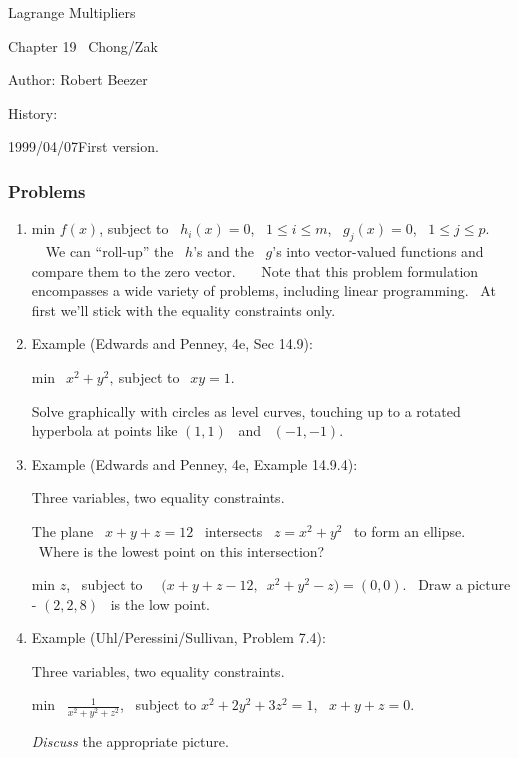\documentclass[12pt,thmsa]{article}
\begin{document}
\vspace{1pt}Lagrange Multipliers

Chapter 19 \ Chong/Zak

Author: Robert Beezer

History:

1999/04/07\qquad First version.

\vspace{1pt}

\subsubsection{Problems}

\vspace{1pt}

\begin{enumerate}
\item  min $f(x)$, subject to \ $h_{i}(x)=0$, \ $1\leq i\leq m$, \ $%
g_{j}(x)=0$, \ $1\leq j\leq p$. \ \ We can ``roll-up'' the \ $h$'s and the \
$g$'s into vector-valued functions and compare them to the zero vector. \ \
\ Note that this problem formulation encompasses a wide variety of problems,
including linear programming. \ At first we'll stick with the equality
constraints only.\bigskip

\item  Example (Edwards and Penney, 4e, Sec 14.9):

min $\ \ x^{2}+y^{2},\ $subject to $\ \ xy=1$.

Solve graphically with circles as level curves, touching up to a rotated
hyperbola at points like $(1,1)$ \ and \ $(-1,-1)$.\bigskip

\item  Example (Edwards and Penney, 4e, Example 14.9.4):

Three variables, two equality constraints.

The plane \ $x+y+z=12$ \ intersects \ $z=x^{2}+y^{2}$ \ to form an ellipse.
\ Where is the lowest point on this intersection?

min $z$, \ subject to \ \ $(x+y+z-12,$\ $x^{2}+y^{2}-z)=(0,0)$. \ Draw a
picture - $(2,2,8)$ \ is the low point.\bigskip

\item  Example (Uhl/Peressini/Sullivan, Problem 7.4):

Three variables, two equality constraints.

min \ $\frac{1}{x^{2}+y^{2}+z^{2}}$, \ subject to $x^{2}+2y^{2}+3z^{2}=1$, \
$x+y+z=0$.

\emph{Discuss} the appropriate picture.
\end{enumerate}
\end{document}
